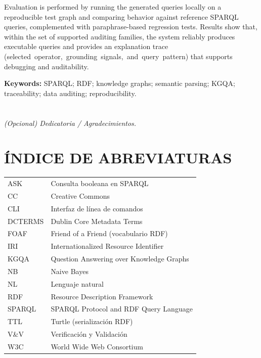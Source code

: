 \documentclass[12pt,a4paper]{article}
\begin{document}
Evaluation is performed by running the generated queries locally on a reproducible test graph and comparing behavior against reference SPARQL queries, complemented with paraphrase-based regression tests. Results show that, within the set of supported auditing families, the system reliably produces executable queries and provides an explanation trace \mbox{(selected operator, grounding signals, and query pattern)} that supports debugging and auditability.

\vspace{0.6cm}
\noindent\textbf{Keywords:} SPARQL; RDF; knowledge graphs; semantic parsing; KGQA; traceability; data auditing; reproducibility.

\clearpage
\thispagestyle{empty}
\null
\clearpage

\thispagestyle{plain}
\section*{}
\vspace*{4cm}
\begin{center}
\textit{(Opcional) Dedicatoria / Agradecimientos.}
\end{center}

\clearpage
\thispagestyle{empty}
\null
\clearpage

\thispagestyle{plain}
\tableofcontents
\clearpage

\thispagestyle{plain}
\listoffigures
\clearpage

\thispagestyle{plain}
\listoftables
\clearpage

\thispagestyle{plain}
\section*{ÍNDICE DE ABREVIATURAS}
\noindent
\begin{tabular}{@{}ll@{}}
ASK & Consulta booleana en SPARQL \\
CC & Creative Commons \\
CLI & Interfaz de línea de comandos \\
DCTERMS & Dublin Core Metadata Terms \\
FOAF & Friend of a Friend (vocabulario RDF) \\
IRI & Internationalized Resource Identifier \\
KGQA & Question Answering over Knowledge Graphs \\
NB & Naive Bayes \\
NL & Lenguaje natural \\
RDF & Resource Description Framework \\
SPARQL & SPARQL Protocol and RDF Query Language \\
TTL & Turtle (serialización RDF) \\
V\&V & Verificación y Validación \\
W3C & World Wide Web Consortium \\
\end{tabular}

\clearpage

\setcounter{page}{1}

\end{document}
